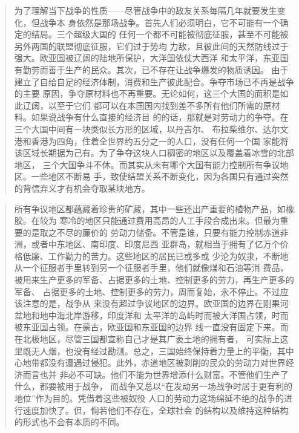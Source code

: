 \begin{quotation}
为了理解当下战争的性质——尽管战争中的敌友关系每隔几年就要发生变化，但战争本
身依然是那场战争。首先人们必须明白，它不可能有一个确定的结局。三个超级大国的
任何一个都不可能被彻底征服，甚至不可能被另外两国的联盟彻底征服，它们过于势均
力敌，且彼此间的天然防线过于强大。欧亚国被辽阔的陆地所保护，大洋国依仗大西洋
和太平洋，东亚国有勤劳而善于生产的民众。其次，已不存在让战争爆发的物质诱因。
由于建立了自给自足的经济体制，消费和生产彼此配合。争夺市场已不再是战争的主要
原因，争夺原材料也不再重要。无论如何，这三个大国的面积是如此辽阔，以至于它们
都可以在本国国内找到差不多所有他们所需的原材料。如果说战争有什么直接的经济目
的的话，那就是对劳动力的争夺。在三个大国中间有一块类似长方形的区域，以丹吉尔、
布拉柴维尔、达尔文港和香港为四角，住着全世界约五分之一的人口，没有任何一个国
家能将该区域长期据为己有。为了争夺这块人口稠密的地区以及覆盖着冰雪的北部地区，
三个大国争斗不休。而其实从未有哪个大国有能力控制所有争议地区。一些地区不断易
手，致使结盟关系不断变化，因为各国只有通过突然的背信弃义才有机会夺取某块地方。
\end{quotation}

\begin{quotation}
所有争议地区都蕴藏着珍贵的矿藏，其中一些还出产重要的植物产品，如橡胶。在较为
寒冷的地区只能通过费用高昂的人工手段合成出来。但最为重要的是取之不尽的廉价的
劳动力储备。不管是谁，只要有能力控制赤道非洲，或者中东地区、南印度、印度尼西
亚群岛，就相当于拥有了亿万个价格低廉、工作勤力的苦力。这些地区的居民已或多或
少沦为奴隶，不断地从一个征服者手里转到另一个征服者手里，他们就像煤和石油等消
费品，被用来生产更多的军备、占据更多的土地、控制更多的劳力，再生产更多的军备、
占据更多的土地、控制更多的劳力，周而复始，永不停止。不过应该注意的是，战争从
来没有超过争议地区的边界。欧亚国的边界在刚果河盆地和地中海北岸游移，印度洋和
太平洋的岛屿时而被大洋国占领，时而被东亚国占领。在蒙古，欧亚国和东亚国的边界
线一直没有固定下来。而在北极地区，尽管三国都宣称自己才是其广袤土地的拥有者，
可实际上这里既无人烟，也没有经过勘测。总之，三国始终保持着力量上的平衡，其中
心地带都没有遭遇过侵犯。此外，赤道地区被剥削的民众的劳动力对世界经济而言也并
非必不可缺。他们不能为世界增添什么财富。不管他们生产了什么，都要被用于战争，
而战争又总以``在发动另一场战争时居于更有利的地位''作为目的。凭借着这些被奴役
人口的劳动力这场绵延不绝的战争的进行速度加快了。但，倘若他们不存在，全球社会
的结构以及维持这种结构的形式也不会有本质的不同。
\end{quotation}

